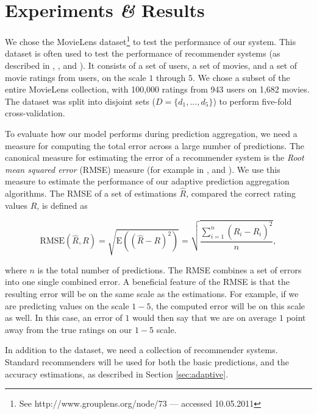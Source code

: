 \section{Experiments \emph{\&} Results}
\label{sec:results}

We chose the MovieLens dataset\footnote{
See http://www.grouplens.org/node/73 --- accessed 10.05.2011}
to test the performance of our system.
This dataset is often used to test the performance of recommender systems
(as described in 
\cite[p.9]{Alshamri2008}, \cite[p.4]{Lemire2005}, \cite[p.1]{Adomavicius2005} and \cite[p.2]{Herlocker2004}).
It consists of a set of users, a set of movies, and a set of movie ratings from users,
on the scale $1$ through $5$.
We chose a subset of the entire MovieLens collection, with 100,000 ratings from 943 users on 1,682 movies.
The dataset was split into disjoint sets
($D = \{ d_1, ..., d_5 \}$) to perform five-fold cross-validation.

To evaluate how our model performs during prediction aggregation, 
we need a measure for computing the total error across a large number of predictions.
The canonical measure for estimating the error of a recommender system
is the \emph{Root mean squared error} (RMSE) measure
(for example in \cite[p.17]{Herlocker2004}, \cite[p.13]{Adomavicius2005} and \cite[p.6]{Bell2007}).
We use this measure to estimate the performance
of our adaptive prediction aggregation algorithms.
The RMSE of a set of estimations $\hat{R}$, 
compared the correct rating values $R$, is defined as

\begin{equation*}
  \mathrm{RMSE}(\hat{R},R) = \sqrt{\mathrm{E}((\hat{R} - R)^2)}
  = \sqrt{\frac{
      \sum_{i=1}^{n} (\hat{R}_i - R_i)^2
    }{
      n
    }},
\end{equation*}

where $n$ is the total number of predictions.
The RMSE combines a set of errors into one single combined error.
A beneficial feature of the RMSE is that the resulting error 
will be on the same scale as the estimations. For example,
if we are predicting values on the scale $1-5$, the computed error
will be on this scale as well. In this case, an error of $1$
would then say that we are on average $1$ point away from the true 
ratings on our $1-5$ scale.

In addition to the dataset, we need a collection of recommender systems.
Standard recommenders will be used for both the basic predictions,
and the accuracy estimations,
as described in Section \ref{sec:adaptive}.

